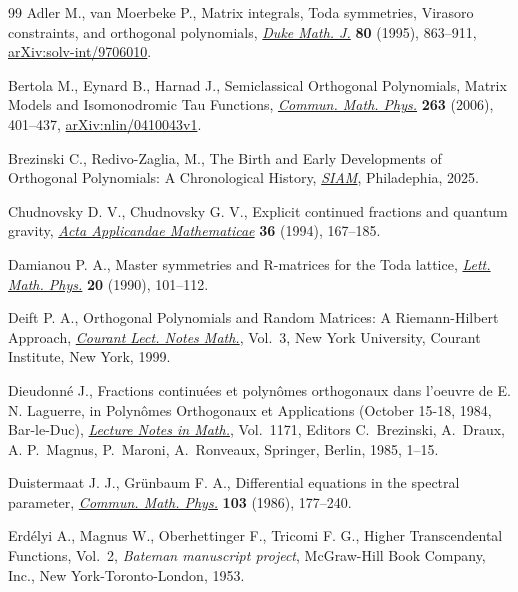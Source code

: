 \documentclass[10pt, reqno]{amsart}
\numberwithin{equation}{section}
\numberwithin{equation}{section}
\begin{document}
\begin{thebibliography}{99}
\footnotesize\itemsep=0pt
\providecommand{\eprint}[2][]{\href{http://arxiv.org/abs/#2}{arXiv:#2}}
Adler M., van Moerbeke P., 
Matrix integrals, Toda symmetries, Virasoro constraints, and orthogonal polynomials, 
\href{https://doi.org//10.1215/S0012-7094-95-08029-6}{\textit{Duke Math. J.}} \textbf{80} (1995), 863--911, 
\eprint{solv-int/9706010}.

 Bertola M., Eynard B., Harnad J.,
Semiclassical Orthogonal Polynomials, Matrix Models and Isomonodromic Tau Functions, 
\href{https://doi.org/10.1007/s00220-005-1505-4}{\textit{Commun. Math. Phys.}} \textbf{263} (2006), 401--437, \eprint{nlin/0410043v1}.

 Brezinski C., Redivo-Zaglia, M.,
The Birth and Early Developments of Orthogonal Polynomials: A Chronological History,
\href{https://doi.org/10.1137/1.9781611978513}{\textit {SIAM}}, Philadephia, 2025.

Chudnovsky D. V., Chudnovsky G. V., 
Explicit continued fractions and quantum gravity, 
\href{https://doi.org//10.1007/BF01001547}{\textit{Acta Applicandae Mathematicae}} \textbf{36} (1994), 167--185.

Damianou P. A., 
Master symmetries and R-matrices for the Toda lattice, 
\href{https://doi.org//10.1007/BF00398275}{\textit{Lett. Math. Phys.}} \textbf{20} (1990), 101--112.

Deift P. A., 
Orthogonal Polynomials and Random Matrices: A Riemann-Hilbert Approach, 
\href{https://doi.org/10.1090/cln/003}{\textit{Courant Lect. Notes Math.}}, Vol.~3, New York University, Courant Institute, New York, 1999.

Dieudonné J., 
Fractions continuées et polynômes orthogonaux dans l'oeuvre de E. N. Laguerre, 
in Polynômes Orthogonaux et Applications (October 15-18, 1984, Bar-le-Duc), 
\href{https://doi.org/10.1007/BFb0076528}{\textit{Lecture Notes in Math.}}, Vol.~1171,
Editors C.~Brezinski, A.~Draux, A. P.~Magnus, P.~Maroni, A.~Ronveaux, Springer, Berlin, 1985, 1--15.

Duistermaat J. J., Grünbaum F. A., 
Differential equations in the spectral parameter, 
\href{https://doi.org/10.1007/BF01206937} {\textit{Commun. Math. Phys.}} \textbf{103} (1986), 177--240.

Erdélyi A., Magnus W., Oberhettinger F., Tricomi F. G., 
Higher Transcendental Functions, Vol.~2, 
\textit{Bateman manuscript project}, McGraw-Hill Book Company, Inc., New York-Toronto-London, 1953.


\end{thebibliography}
\end{document}
